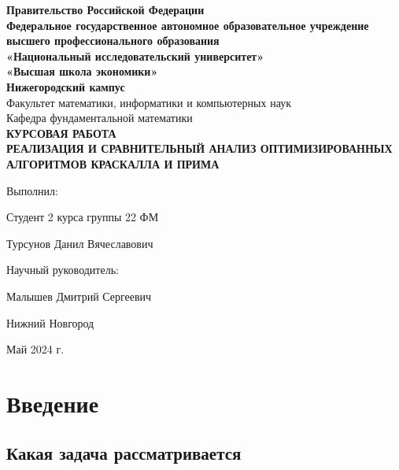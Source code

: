 


	\setcounter{page}{1}
	
	\begin{center} 
		\textbf{Правительство Российской Федерации}
		\\ \textbf{Федеральное государственное автономное образовательное учреждение}
		\\ \textbf{высшего профессионального образования}
		\\ \textbf{«Национальный исследовательский университет»}
		\\ \textbf{«Высшая школа экономики»}
		\\ \textbf{Нижегородский кампус}
		\vspace{3cm}
		\\ Факультет математики, информатики и компьютерных наук
		\\ Кафедра фундаментальной математики
		\vspace{3cm}
		\\ \large\textbf{КУРСОВАЯ РАБОТА}
		\vspace{0.3cm}
		\\ \large\textbf{РЕАЛИЗАЦИЯ И СРАВНИТЕЛЬНЫЙ АНАЛИЗ ОПТИМИЗИРОВАННЫХ АЛГОРИТМОВ КРАСКАЛЛА И ПРИМА}
	\end{center}
	
	\vspace{2cm}\hspace{8cm} Выполнил: 
	\par \hspace{8cm} Студент 2 курса группы 22 ФМ 
	\par \hspace{8cm} Турсунов Данил Вячеславович
	\par \vspace{0.8cm} \hspace{8cm} Научный руководитель:
	\par \hspace{8cm} Малышев Дмитрий Сергеевич
	\begin{center} 
		\vspace{3cm} Нижний Новгород
		\par Май 2024 г.
	\end{center}
	\newpage
	
	\tableofcontents
	\newpage

	\section{Введение}
	\subsection{Какая задача рассматривается}
	
